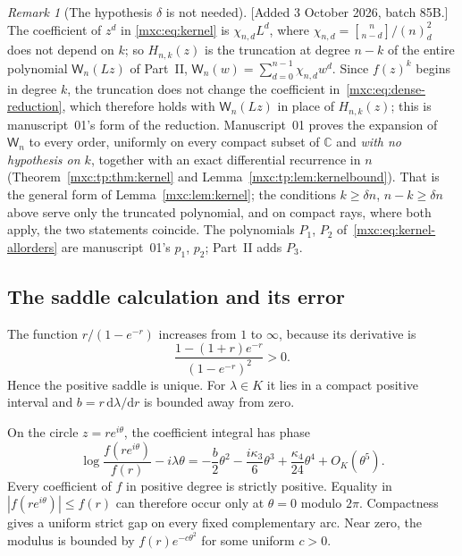 \documentclass[11pt]{article}
\numberwithin{equation}{section}
\theoremstyle{definition}
\theoremstyle{remark}
\newtheorem{remark}[theorem]{Remark}
\newcommand{\StirOne}[2]{\genfrac{[}{]}{0pt}{}{#1}{#2}}
\begin{document}
\begin{remark}[The hypothesis $\delta$ is not needed]\label{mxc:rem:kernel-untruncated}
[Added 3 October 2026, batch 85B.] The coefficient of $z^d$ in
\eqref{mxc:eq:kernel} is $\chi_{n,d}L^d$, where
$\chi_{n,d}=\StirOne{n}{n-d}/(n)_d^2$ does not depend on $k$; so
$H_{n,k}(z)$ is the truncation at degree $n-k$ of the entire polynomial
$\mathsf W_n(Lz)$ of Part~II, $\mathsf W_n(w)=\sum_{d=0}^{n-1}\chi_{n,d}w^d$.
Since $f(z)^k$ begins in degree $k$, the truncation does not change the
coefficient in~\eqref{mxc:eq:dense-reduction}, which therefore holds with
$\mathsf W_n(Lz)$ in place of $H_{n,k}(z)$; this is manuscript~01's form of
the reduction. Manuscript~01 proves the expansion of $\mathsf W_n$ to every
order, uniformly on every compact subset of $\mathbb C$ and \emph{with no
hypothesis on $k$}, together with an exact differential recurrence in $n$
(Theorem~\ref{mxc:tp:thm:kernel} and Lemma~\ref{mxc:tp:lem:kernelbound}).
That is the general form of Lemma~\ref{mxc:lem:kernel}; the conditions
$k\ge\delta n$, $n-k\ge\delta n$ above serve only the truncated polynomial,
and on compact rays, where both apply, the two statements coincide.
The polynomials $P_1$, $P_2$ of~\eqref{mxc:eq:kernel-allorders} are
manuscript~01's $p_1$, $p_2$; Part~II adds $P_3$.
\end{remark}

\subsection{The saddle calculation and its error}
The function $r/(1-e^{-r})$ increases from $1$ to $\infty$, because
its derivative is
\[
 \frac{1-(1+r)e^{-r}}{(1-e^{-r})^2}>0.
\]
Hence the positive saddle is unique. For $\lambda\in K$ it lies in
a compact positive interval and $b=r\,\mathrm d\lambda/\mathrm dr$
is bounded away from zero.

On the circle $z=r e^{i\theta}$, the coefficient integral has phase
\begin{equation}\label{mxc:eq:phase}
 \log\frac{f(r e^{i\theta})}{f(r)}-i\lambda\theta
 =-\frac b2\theta^2-\frac{i\kappa_3}{6}\theta^3
                  +\frac{\kappa_4}{24}\theta^4+O_K(\theta^5).
\end{equation}
Every coefficient of $f$ in positive degree is strictly positive.
Equality in $|f(r e^{i\theta})|\le f(r)$ can therefore occur only
at $\theta=0$ modulo $2\pi$. Compactness gives a uniform strict
gap on every fixed complementary arc. Near zero, the modulus is
bounded by $f(r)e^{-c\theta^2}$ for some uniform $c>0$.
\end{document}
